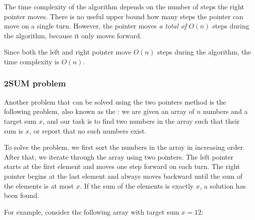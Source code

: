 \begin{center}
\end{center}

The time complexity of the algorithm depends on
the number of steps the right pointer moves.
There is no useful upper bound how many steps the
pointer can move on a single turn.
However, the pointer moves \emph{a total of}
$O(n)$ steps during the algorithm,
because it only moves forward.

Since both the left and right pointer
move $O(n)$ steps during the algorithm,
the time complexity is $O(n)$.

\subsubsection{2SUM problem}


Another problem that can be solved using
the two pointers method is the following problem,
also known as the :
we are given an array of $n$ numbers and
a target sum $x$, and our task is to find two numbers
in the array such that their sum is $x$,
or report that no such numbers exist.

To solve the problem, we first
sort the numbers in the array in increasing order.
After that, we iterate through the array using
two pointers.
The left pointer starts at the first element
and moves one step forward on each turn.
The right pointer begins at the last element
and always moves backward until the sum of the
elements is at most $x$.
If the sum of the elements is exactly $x$,
a solution has been found.

For example, consider the following array
with target sum $x=12$:
\begin{center}
\end{center}

